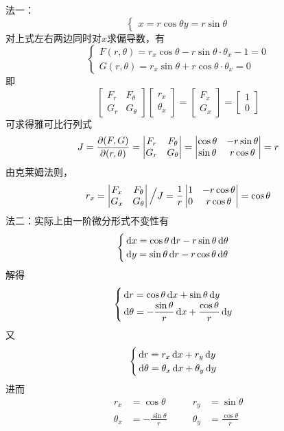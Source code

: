 \begin{analysis}
法一：
\[\begin{cases}
x=r\cos\theta
y=r\sin\theta
\end{cases}\]
对上式左右两边同时对$x$求偏导数，有
\[\begin{cases}
F(r,\theta)=r_x\cos\theta-r\sin\theta\cdot\theta_x-1=0\\
G(r,\theta)=r_x\sin\theta+r\cos\theta\cdot\theta_x=0
\end{cases}\]
即
\[\begin{bmatrix}F_r&F_\theta\\G_r&G_\theta\end{bmatrix}
\begin{bmatrix}r_x\\\theta_x\end{bmatrix}
=\begin{bmatrix}F_x\\G_x\end{bmatrix}
=\begin{bmatrix}1\\0\end{bmatrix}\]
可求得雅可比行列式
\[J=\dfrac{\partial (F,G)}{\partial (r,\theta)}=\begin{vmatrix}F_r&F_\theta\\G_r&G_\theta\end{vmatrix}
=\begin{vmatrix}\cos\theta & -r\sin\theta\\\sin\theta & r\cos\theta\end{vmatrix}=r\]
由克莱姆法则，
\[r_x=\begin{vmatrix}F_x&F_\theta\\G_x&G_\theta\end{vmatrix}\Big/J=\dfrac{1}{r}\begin{vmatrix}1&-r\cos\theta\\0&r\cos\theta\end{vmatrix}=\cos\theta\]
法二：实际上由一阶微分形式不变性有
\[\begin{cases}
\,\mathrm{d} x=\cos\theta \,\mathrm{d} r-r\sin\theta\,\mathrm{d}\theta\\
\,\mathrm{d} y=\sin\theta \,\mathrm{d} r-r\cos\theta\,\mathrm{d}\theta
\end{cases}\]
解得
\[\begin{cases}
\,\mathrm{d} r=\cos\theta\,\mathrm{d} x+\sin\theta\,\mathrm{d} y\\
\,\mathrm{d}\theta=-\dfrac{\sin\theta}{r}\,\mathrm{d} x+\dfrac{\cos\theta}{r}\,\mathrm{d} y
\end{cases}\]
又
\[\begin{cases}
\,\mathrm{d} r = r_x\,\mathrm{d} x+r_y\,\mathrm{d} y\\
\,\mathrm{d} \theta=\theta_x\,\mathrm{d} x+\theta_y\,\mathrm{d} y
\end{cases}\]
进而
\[\begin{aligned}
r_x&=\cos\theta\qquad&r_y&=\sin\theta\\
\theta_x&=-\frac{\sin\theta}{r}&\theta_y&=\frac{\cos\theta}{r}
\end{aligned}\]
\end{analysis}

